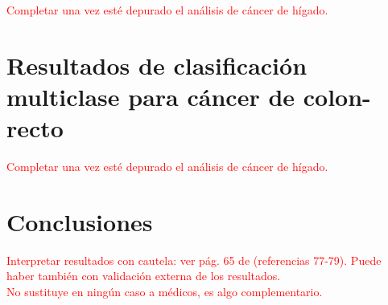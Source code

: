 \textcolor{red}{Completar una vez esté depurado el análisis de cáncer de hígado.}

\section{Resultados de clasificación multiclase para cáncer de colon-recto}

\textcolor{red}{Completar una vez esté depurado el análisis de cáncer de hígado.}

\section{Conclusiones}

\textcolor{red}{Interpretar resultados con cautela: ver pág. 65 de \cite{CastilloSecilla2020} (referencias 77-79). Puede haber también con validación externa de los resultados.}\\

\textcolor{red}{No sustituye en ningún caso a médicos, es algo complementario.}